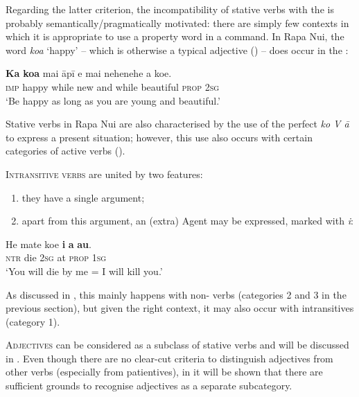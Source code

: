 Regarding the latter criterion, the incompatibility of stative verbs with the  is probably semantically/pragmatically motivated: there are simply few contexts in which it is appropriate to use a property word in a command. In Rapa Nui, the word \textit{koa} ‘happy’ – which is otherwise a typical adjective () – does occur in the :

\ea\label{ex:3.90}
\gll \textbf{Ka} \textbf{koa} mai {\ꞌ}āpī {\ꞌ}e mai nehenehe a koe. \\
\textsc{imp} happy while new and while beautiful \textsc{prop} \textsc{2sg} \\

\glt
‘Be happy as long as you are young and beautiful.’ \textstyleExampleref{[R453.018]} 
\z

Stative verbs in Rapa Nui are also characterised by the use of the perfect  \textit{ko V {\ꞌ}ā} to express a present situation; however, this use also occurs with certain categories of active verbs ().

\textsc{Intransitive verbs} are united by two features:

\begin{enumerate}
\item 
they have a single argument;

\item 
apart from this argument, an (extra) Agent may be expressed, marked with \textit{i}:

\end{enumerate}

\ea\label{ex:3.91}
\gll He mate koe \textbf{i} \textbf{a} \textbf{au}. \\
\textsc{ntr} die \textsc{2sg} at \textsc{prop} \textsc{1sg} \\

\glt
‘You will die by me = I will kill you.’ \textstyleExampleref{[Mtx-3-01.147]}
\z

As discussed in , this mainly happens with non- verbs (categories 2 and 3 in the previous section), but given the right context, it may also occur with  intransitives (category 1).

\textsc{Adjectives} can be considered as a subclass of stative verbs and will be discussed in . Even though there are no clear-cut criteria to distinguish adjectives from other verbs (especially from patientives), in  it will be shown that there are sufficient grounds to recognise adjectives as a separate subcategory.

